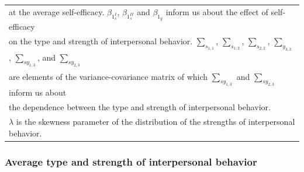 \documentclass[man,mask]{apa6}
\begin{document}
\begin{table}
\begin{tabular}[t]{lllllll}
\multicolumn{7}{l}{at the average self-efficacy. $\beta_{1_s^{I}}$, $\beta_{1_s^{II}}$ and $\beta_{1_y}$ inform us about the effect of self-efficacy }\\
\multicolumn{7}{l}{on the type and strength of interpersonal behavior. $\sum_{s_{1,1}}$, $\sum_{s_{1,2}}$, $\sum_{s_{2,2}}$, $\sum_{y_{3,3}}$, $\sum_{sy_{1,3}}$,  and $\sum_{sy_{2,3}}$ }\\
\multicolumn{7}{l}{are elements of the variance-covariance matrix of which $\sum_{sy_{1,3}}$ and $\sum_{sy_{2,3}}$ inform us about}\\
\multicolumn{7}{l}{the dependence between the type and strength of interpersonal behavior.}\\
\multicolumn{7}{l}{$\lambda$ is the skewness parameter of the distribution of the strengths of interpersonal behavior.}\\
\end{tabular}
\end{table}

\vspace{-0.5cm}
\subsubsection{Average type and strength of interpersonal behavior}
\end{document}
